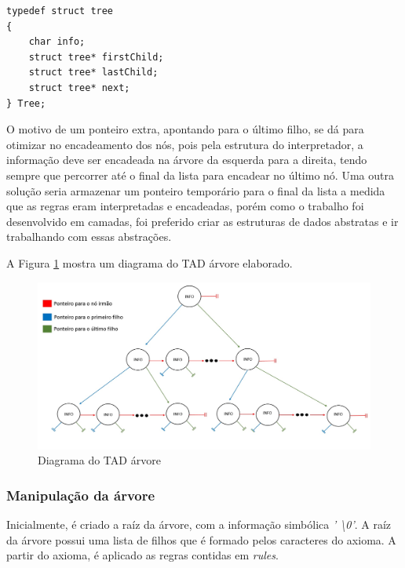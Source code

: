\documentclass[a4paper,12pt]{article}%
\begin{document}
\begin{verbatim}
typedef struct tree                                     
{
    char info;                                  
    struct tree* firstChild;                   
    struct tree* lastChild;                    
    struct tree* next;                         
} Tree;
\end{verbatim}

O motivo de um ponteiro extra, apontando para o último filho, se dá para otimizar no encadeamento dos nós, pois pela estrutura 
do interpretador, a informação deve ser encadeada na árvore da esquerda para a direita, tendo sempre que percorrer até o final da lista 
para encadear no último nó. Uma outra solução seria armazenar um ponteiro temporário para o final da lista a medida que as regras eram 
interpretadas e encadeadas, porém como o trabalho foi desenvolvido em camadas, foi preferido criar as estruturas de dados abstratas e ir 
trabalhando com essas abstrações.

A Figura \ref{fig:Tree} mostra um diagrama do TAD árvore elaborado.
\newline
\begin{figure}[ht!] 
\centering
\includegraphics[width=160mm]{Arvore.jpg}
\caption{Diagrama do TAD árvore}
\label{fig:Tree} 
\end{figure}



\subsubsection{Manipulação da árvore}

\hspace{1.5em}Inicialmente, é criado a raíz da árvore, com a informação simbólica \emph{' \textbackslash0'}. 
A raíz da árvore possui uma lista de filhos que é formado pelos caracteres do axioma. A partir do axioma, 
é aplicado as regras contidas em \emph{rules}.
\end{document}
